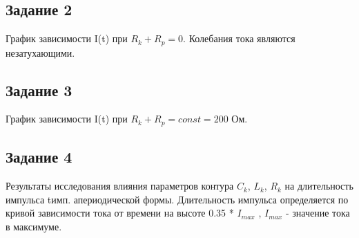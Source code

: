 \documentclass[a4paper,oneside,12pt]{extreport}
\begin{document}
\newpage
\subsection{Задание 2}

График зависимости I(t) при $R_k + R_p = 0$. 
Колебания тока являются незатухающими.
\begin{figure}[ht!]
\end{figure}

\subsection{Задание 3}

График зависимости I(t) при $R_k + R_p = const = 200$ Ом. 
\begin{figure}[ht!]
\end{figure}

\newpage
\subsection{Задание 4}

Результаты исследования влияния параметров контура
$C_k$, $L_k$, $R_k$ на длительность импульса tимп. апериодической формы.
Длительность импульса определяется по кривой зависимости тока 
от времени на высоте 0.35 *  $I_{max}$  , $I_{max}$ - значение тока в максимуме.
\end{document}
